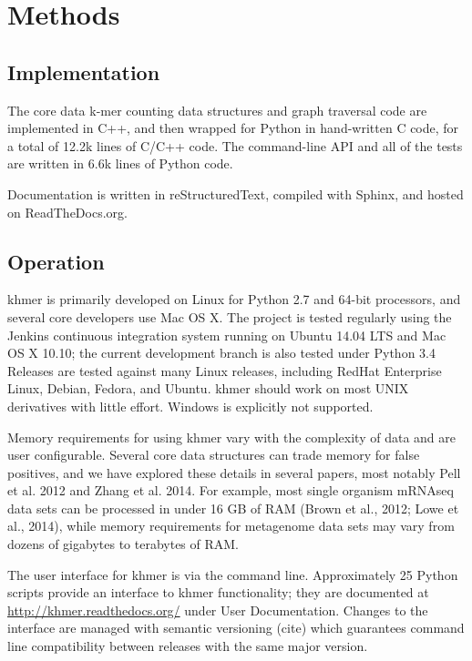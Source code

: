 \documentclass[10pt,a4paper,twocolumn]{article}
\begin{document}
\section*{Methods}
\subsection*{Implementation}

The core data k-mer counting data structures and graph traversal code are implemented in C++, and
then wrapped for Python in hand-written C code, for a total of
12.2k lines of C/C++ code.  The command-line API and all of the tests
are written in 6.6k lines of Python code.

Documentation is written in reStructuredText, compiled with Sphinx, and hosted on ReadTheDocs.org.

\subsection*{Operation}

khmer is primarily developed on Linux for Python 2.7 and 64-bit processors, and several core developers use Mac OS X.  The project is tested regularly using the Jenkins continuous integration system running on Ubuntu 14.04 LTS and Mac OS X 10.10; the current development branch is also tested under Python 3.4  Releases are tested against many Linux releases, including RedHat Enterprise Linux, Debian, Fedora, and Ubuntu.  khmer should work on most UNIX derivatives with little effort.  Windows is explicitly not supported.

Memory requirements for using khmer vary with the complexity of data and are user configurable.  Several core data structures can trade memory for false positives, and we have explored these details in several papers, most notably Pell et al. 2012 and Zhang et al. 2014.  For example, most single organism mRNAseq data sets can be processed in under 16 GB of RAM (Brown et al., 2012; Lowe et al., 2014), while memory requirements for metagenome data sets may vary from dozens of gigabytes to terabytes of RAM.

The user interface for khmer is via the command line.  Approximately 25 Python scripts provide an  interface to khmer functionality; they are documented at \url{http://khmer.readthedocs.org/} under User Documentation.  Changes to the interface are managed with semantic versioning (cite) which guarantees command line compatibility between releases with the same major version.
\end{document}

